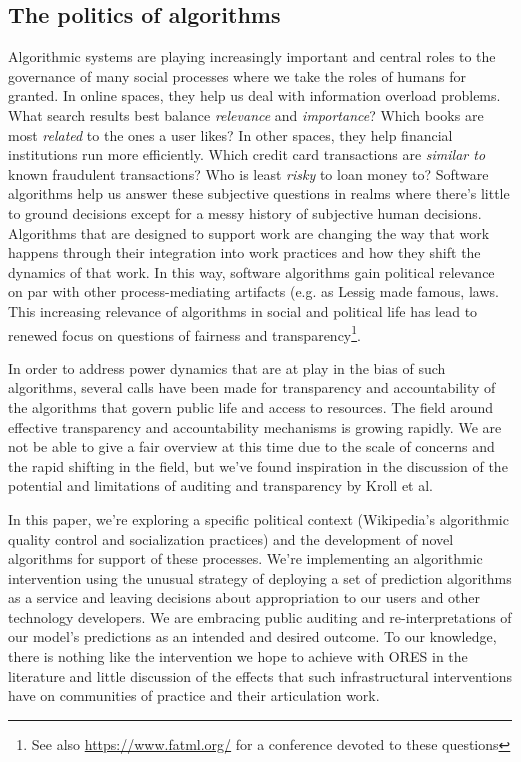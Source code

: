 \subsection{The politics of algorithms}
Algorithmic systems are playing increasingly important and central roles to the governance of many social processes where we take the roles of humans for granted\cite{gillespie2014relevance}.  In online spaces, they help us deal with information overload problems.  What search results best balance \emph{relevance} and \emph{importance}?  Which books are most \emph{related} to the ones a user likes?  In other spaces, they help financial institutions run more efficiently.  Which credit card transactions are \emph{similar to} known fraudulent transactions?  Who is least \emph{risky} to loan money to?  Software algorithms help us answer these subjective questions in realms where there's little to ground decisions except for a messy history of subjective human decisions\cite{tufekci2015algorithms}.  Algorithms that are designed to support work are changing the way that work happens through their integration into work practices and how they shift the dynamics of that work\cite{crawford2016algorithm}\cite{gillespie2014relevance}.  In this way, software algorithms gain political relevance on par with other process-mediating artifacts (e.g. as Lessig made famous, laws\cite{lessig1999code}.  This increasing relevance of algorithms in social and political life has lead to renewed focus on questions of fairness and transparency\footnote{See also \url{https://www.fatml.org/} for a conference devoted to these questions}.

In order to address power dynamics that are at play in the bias of such algorithms, several calls have been made for transparency and accountability of the algorithms that govern public life and access to resources\cite{diakopoulos2015algorithmic}\cite{sandvig2014auditing}\cite{kroll2016accountable}.  The field around effective transparency and accountability mechanisms is growing rapidly.  We are not be able to give a fair overview at this time due to the scale of concerns and the rapid shifting in the field, but we've found inspiration in the discussion of the potential and limitations of auditing and transparency by Kroll et al.\cite{kroll2016accountable}

In this paper, we're exploring a specific political context (Wikipedia's algorithmic quality control and socialization practices) and the development of novel algorithms for support of these processes.  We're implementing an algorithmic intervention using the unusual strategy of deploying a set of prediction algorithms as a service and leaving decisions about appropriation to our users and other technology developers.  We are embracing public auditing and re-interpretations of our model's predictions as an intended and desired outcome.  To our knowledge, there is nothing like the intervention we hope to achieve with ORES in the literature and little discussion of the effects that such infrastructural interventions have on communities of practice and their articulation work.

